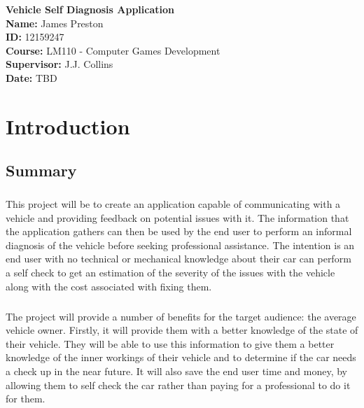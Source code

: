 \documentclass[12pt]{report}
\begin{document}
\begin{titlepage}
	\begin{center}		
		\vspace*{5cm}
		\textbf{\Large{Vehicle Self Diagnosis Application}}\\
		\vspace{5cm}		
		\textbf{Name:} James Preston\\
		\textbf{ID:} 12159247\\
		\textbf{Course:} LM110 - Computer Games Development\\
		\textbf{Supervisor:} J.J. Collins\\
		\textbf{Date:} TBD\\

	\end{center}
\end{titlepage}

	\tableofcontents
	\newpage
	
	\chapter{Introduction}
		\section{Summary}
			\paragraph{}{
			This project will be to create an application capable of communicating with a vehicle and providing feedback on potential issues with it. The information that the application gathers can then be used by the end user to perform an informal diagnosis of the vehicle before seeking professional assistance. The intention is an end user with no technical or mechanical knowledge about their car can perform a self check to get an estimation of the severity of the issues with the vehicle along with the cost associated with fixing them.
			}
			\paragraph{}{
			The project will provide a number of benefits for the target audience: the average vehicle owner. Firstly, it will provide them with a better knowledge of the state of their vehicle. They will be able to use this information to give them a better knowledge of the inner workings of their vehicle and to determine if the car needs a check up in the near future. It will also save the end user time and money, by allowing them to self check the car rather than paying for a professional to do it for them.
			}
\end{document}
